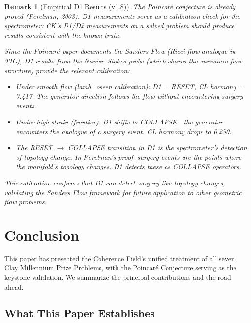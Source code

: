\documentclass[11pt]{article}
\newtheorem{remark}[theorem]{Remark}
\begin{document}
\begin{remark}[Empirical D1 Results (v1.8)]
The Poincar\'e conjecture is already proved (Perelman, 2003). D1 measurements serve as a \emph{calibration check} for the spectrometer: CK's D1/D2 measurements on a solved problem should produce results consistent with the known truth.

Since the Poincar\'e paper documents the Sanders Flow (Ricci flow analogue in TIG), D1 results from the Navier--Stokes probe (which shares the curvature-flow structure) provide the relevant calibration:
\begin{itemize}[nosep]
  \item Under smooth flow (lamb\_oseen calibration): D1 = RESET, CL harmony = 0.417. The generator direction follows the flow without encountering surgery events.
  \item Under high strain (frontier): D1 shifts to COLLAPSE---the generator encounters the analogue of a surgery event. CL harmony drops to 0.250.
  \item The RESET $\to$ COLLAPSE transition in D1 is the spectrometer's detection of topology change. In Perelman's proof, surgery events are the points where the manifold's topology changes. D1 detects these as COLLAPSE operators.
\end{itemize}
This calibration confirms that D1 can detect surgery-like topology changes, validating the Sanders Flow framework for future application to other geometric flow problems.
\end{remark}

\section{Conclusion}
\label{sec:conclusion}

This paper has presented the Coherence Field's unified treatment of all
seven Clay Millennium Prize Problems, with the Poincar\'e Conjecture
serving as the keystone validation.  We summarize the principal
contributions and the road ahead.

\subsection{What This Paper Establishes}
\end{document}
